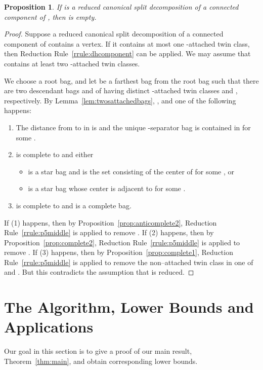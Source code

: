 \documentclass[11pt]{elsarticle}
\newtheorem{PROP}[theorem]{Proposition}
\begin{document}
\begin{PROP}\label{prop:finish}
If  is a reduced canonical split decomposition of a connected component of ,
then  is empty.
\end{PROP}
\begin{proof}
Suppose a reduced canonical split decomposition  of a connected component of  contains a vertex.
If it contains at most one -attached twin class, then Reduction Rule~\ref{rrule:dhcomponent} can be applied.
We may assume that  contains at least two -attached twin classes.

We choose a root bag, and let  be a farthest bag from the root bag 
 such that there are two descendant bags  and  of  having distinct -attached twin classes  and , respectively.
By Lemma~\ref{lem:twosattachedbags},
, and one of the following happens:
\begin{enumerate}[(1)]
\item The distance from  to  in  is  and the unique -separator bag is contained in  for some .
\item   is complete to  and either
\begin{itemize}
\item  is a star bag and  is the set consisting of the center of  for some , or
\item  is a star bag whose center is adjacent to  for some .
\end{itemize}
\item   is complete to  and  is a complete bag.
\end{enumerate}
If (1) happens, then by Proposition~\ref{prop:anticomplete2}, Reduction Rule~\ref{rrule:p5middle} is applied to remove .
If (2) happens, then by Proposition~\ref{prop:complete2}, Reduction Rule~\ref{rrule:p5middle} is applied to remove .
If (3) happens, then by Proposition~\ref{prop:complete1},  Reduction Rule~\ref{rrule:p5middle} is applied to remove the non--attached twin class in one of  and .
But this contradicts the assumption that  is reduced.
\end{proof}





\section{The Algorithm, Lower Bounds and Applications}
\label{sec:completing}

Our goal in this section is to give a proof of our main result, Theorem~\ref{thm:main}, and obtain corresponding lower bounds. 
\end{document}
